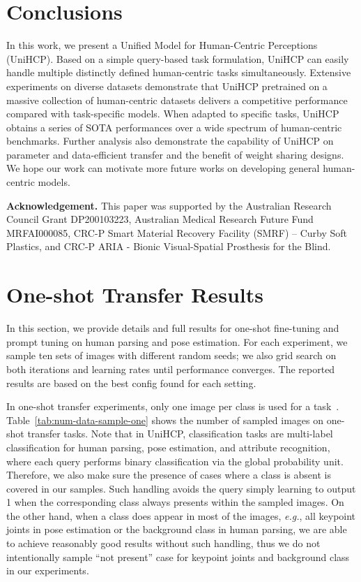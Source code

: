 \documentclass[10pt,twocolumn,letterpaper]{article}
\begin{document}
\section{Conclusions}
\label{sec:conclu}
In this work, we present a Unified Model for Human-Centric Perceptions (UniHCP). 
Based on a simple query-based task formulation, UniHCP can easily handle multiple distinctly defined human-centric tasks simultaneously. Extensive experiments on diverse datasets demonstrate that UniHCP pretrained on a massive collection of human-centric datasets delivers a competitive performance compared with task-specific models. When adapted to specific tasks, UniHCP obtains a series of SOTA performances over a wide spectrum of human-centric benchmarks. Further analysis also demonstrate the capability of UniHCP on parameter and data-efficient transfer and the benefit of weight sharing designs. We hope our work can motivate more future works on developing general human-centric models. 

\noindent\textbf{Acknowledgement.} This paper was supported by the Australian Research Council Grant DP200103223, Australian Medical Research Future Fund MRFAI000085, CRC-P Smart Material Recovery Facility (SMRF) – Curby Soft Plastics, and CRC-P ARIA - Bionic Visual-Spatial Prosthesis for the Blind.



{\small


}

\clearpage
\appendix


\section{One-shot Transfer Results}
In this section, we provide details and full results for one-shot fine-tuning and prompt tuning on human parsing and pose estimation. For each experiment, we sample ten sets of images with different random seeds; we also grid search on both iterations and learning rates until performance converges. The reported results 
 are based on the best config found for each setting. 

 In one-shot transfer experiments, only one image per class is used for a task~\cite{fei2006one}. Table~\ref{tab:num-data-sample-one} shows the number of sampled images on one-shot transfer tasks. Note that in UniHCP, classification tasks are multi-label classification for human parsing, pose estimation, and attribute recognition, where each query performs binary classification via the global probability unit. Therefore, we also make sure the presence of cases where a class is absent is covered in our samples. Such handling avoids the query simply learning to output 1 when the corresponding class always presents within the sampled images.
On the other hand, when a class does appear in most of the images, \emph{e.g.}, all keypoint joints in pose estimation or the background class in human parsing, we are able to achieve reasonably good results without such handling, thus we do not intentionally sample ``not present'' case for keypoint joints and background class in our experiments.
\end{document}
